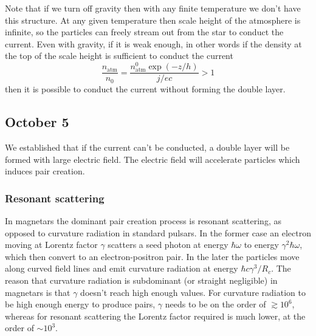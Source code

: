 \documentclass[letterpaper, 11pt]{article}
\numberwithin{equation}{section}
\numberwithin{figure}{section}
\begin{document}
Note that if we turn off gravity then with any finite temperature we don't have this structure. At any given temperature then scale height of the atmosphere is infinite, so the particles can freely stream out from the star to conduct the current. Even with gravity, if it is weak enough, in other words if the density at the top of the scale height is sufficient to conduct the current
\begin{equation}
    \label{eq:41}
    \frac{n_\mathrm{atm}}{n_0} = \frac{n_\mathrm{atm}^0\exp(-z/h)}{j/ec} > 1
\end{equation}
then it is possible to conduct the current without forming the double layer.

\subsection{October 5}
\label{sec:oct-5}

We established that if the current can't be conducted, a double layer will be formed with large electric field. The electric field will accelerate particles which induces pair creation.

\subsubsection{Resonant scattering}
\label{sec:res-scatter}

In magnetars the dominant pair creation process is resonant scattering, as opposed to curvature radiation in standard pulsars. In the former case an electron moving at Lorentz factor $\gamma$ scatters a seed photon at energy $\hbar\omega$ to energy $\gamma^2\hbar\omega$, which then convert to an electron-positron pair. In the later the particles move along curved field lines and emit curvature radiation at energy $\hbar c\gamma^3/R_c$. The reason that curvature radiation is subdominant (or straight negligible) in magnetars is that $\gamma$ doesn't reach high enough values. For curvature radiation to be high enough energy to produce pairs, $\gamma$ needs to be on the order of $\gtrsim 10^6$, whereas for resonant scattering the Lorentz factor required is much lower, at the order of $\sim 10^3$.
\end{document}
